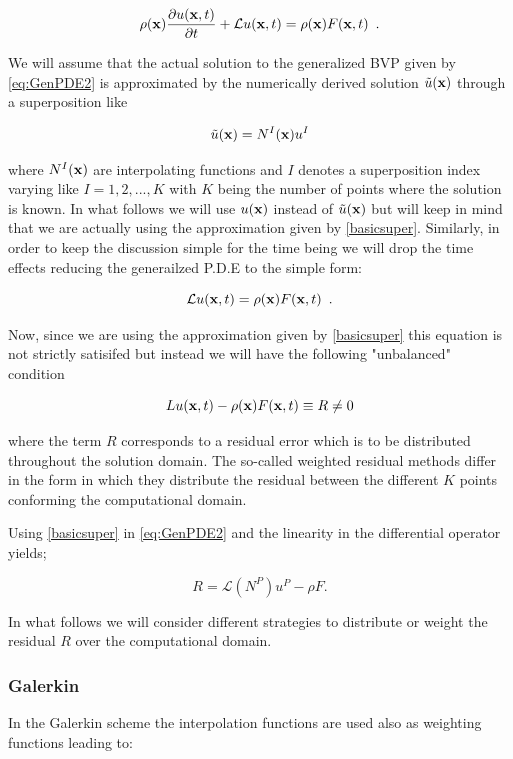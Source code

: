 \begin{equation}
\rho(\vb x) \pdv{u(\vb x, t)}{t} + \mathcal{L}u(\vb x, t) = \rho (\vb x)F(\vb x, t) \enspace .
\label{eq:GenPDE2}
\end{equation}


We will assume that the actual solution to the generalized BVP given by \cref{eq:GenPDE2} is approximated by the numerically derived solution $\tilde u(\vb{x})$ through a superposition like

\begin{equation}
\tilde u (\vb{x}) = {N^I}(\vb{x}){u^I}
\label{basicsuper}
\end{equation}

where ${N^I}(\vb{x})$ are interpolating functions and $I$ denotes a superposition index  varying like $I=1,2,...,K$ with $K$ being the number of points where the solution is known. In what follows we will use $u(\vb{x})$ instead of $\tilde u (\vb{x})$ but will keep in mind that we are actually using the approximation given by \cref{basicsuper}. Similarly, in order to keep the discussion simple for the time being we will drop the time effects reducing the generailzed P.D.E to the simple form:

\begin{equation}
\mathcal{L}u(\vb x, t) = \rho (\vb x)F(\vb x, t) \enspace .
\label{eq:GenPDE3}
\end{equation}



Now, since we are using the approximation given by \cref{basicsuper} this equation is not strictly satisifed but instead we will have the following "unbalanced" condition

\[Lu(\vb{x},t) - \rho (\vb{x})F(\vb{x}, t) \equiv R \ne 0\]

where the term $R$ corresponds to a residual error which is to be distributed throughout the solution domain. The so-called weighted residual methods differ in the form in which they distribute the residual between the different $K$ points conforming the computational domain.

Using \cref{basicsuper} in \cref{eq:GenPDE2} and the linearity in the differential operator yields;

\[R = \mathcal{L}({N^P}){u^P} - \rho F.\]

In what follows we will consider different strategies to distribute or weight the residual $R$ over the computational domain.

\subsubsection{Galerkin}
In the Galerkin scheme the interpolation functions are used also as weighting functions leading to:

